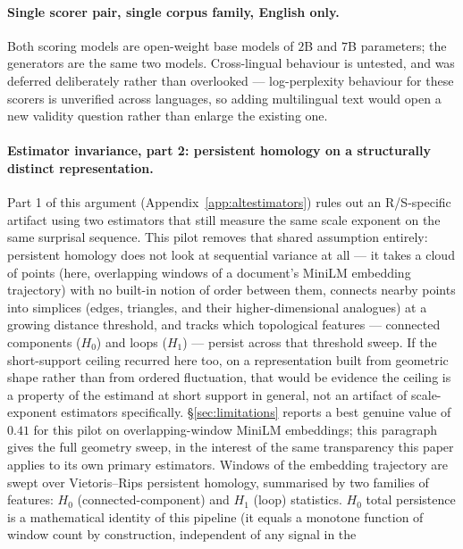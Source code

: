 \documentclass{article}
\begin{document}
\paragraph{Single scorer pair, single corpus family, English only.} Both scoring
models are open-weight base models of $2$B and $7$B parameters; the generators are
the same two models. Cross-lingual behaviour is untested, and was deferred
deliberately rather than overlooked --- log-perplexity behaviour for these scorers
is unverified across languages, so adding multilingual text would open a new
validity question rather than enlarge the existing one.

\paragraph{Estimator invariance, part 2: persistent homology on a
structurally distinct representation.} Part 1 of this argument
(Appendix~\ref{app:altestimators}) rules out an R/S-specific artifact using
two estimators that still measure the same scale exponent on the same
surprisal sequence. This pilot removes that shared assumption entirely:
persistent homology does not look at sequential variance at all --- it takes
a cloud of points (here, overlapping windows of a document's MiniLM embedding
trajectory) with no built-in notion of order between them, connects nearby
points into simplices (edges, triangles, and their higher-dimensional
analogues) at a growing distance threshold, and tracks which topological
features --- connected components ($H_0$) and loops ($H_1$) --- persist
across that threshold sweep. If the short-support ceiling recurred here too,
on a representation built from geometric shape rather than from ordered
fluctuation, that would be evidence the ceiling is a property of the estimand
at short support in general, not an artifact of scale-exponent estimators
specifically. \S\ref{sec:limitations} reports a best genuine value of $0.41$ for
this pilot on overlapping-window MiniLM embeddings; this paragraph gives the
full geometry sweep, in the interest of the same transparency this paper
applies to its own primary estimators. Windows of the embedding trajectory
are swept over
Vietoris--Rips persistent homology, summarised by two families of features:
$H_0$ (connected-component) and $H_1$ (loop) statistics. $H_0$ total
persistence is a mathematical identity of this pipeline (it equals a monotone
function of window count by construction, independent of any signal in the
\end{document}
